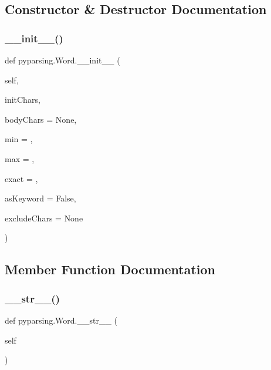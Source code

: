 \subsection{Constructor \& Destructor Documentation}
\mbox{\label{classpyparsing_1_1Word_ac613b7889b8235da3963fda4173b40d1}} 
\subsubsection{\texorpdfstring{\+\_\+\+\_\+init\+\_\+\+\_\+()}{\_\_init\_\_()}}
{\footnotesize\ttfamily def pyparsing.\+Word.\+\_\+\+\_\+init\+\_\+\+\_\+ (\begin{DoxyParamCaption}\item[{}]{self,  }\item[{}]{init\+Chars,  }\item[{}]{body\+Chars = {\ttfamily None},  }\item[{}]{min = {},  }\item[{}]{max = {},  }\item[{}]{exact = {},  }\item[{}]{as\+Keyword = {\ttfamily False},  }\item[{}]{exclude\+Chars = {\ttfamily None} }\end{DoxyParamCaption})}



\subsection{Member Function Documentation}
\mbox{\label{classpyparsing_1_1Word_a6a028763c3941a776ef330e895b717df}} 
\subsubsection{\texorpdfstring{\+\_\+\+\_\+str\+\_\+\+\_\+()}{\_\_str\_\_()}}
{\footnotesize\ttfamily def pyparsing.\+Word.\+\_\+\+\_\+str\+\_\+\+\_\+ (\begin{DoxyParamCaption}\item[{}]{self }\end{DoxyParamCaption})}

